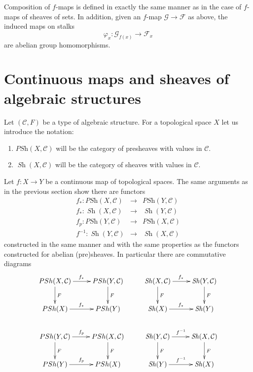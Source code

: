 \documentclass{stacks-project}
\theoremstyle{plain}
\theoremstyle{definition}
\theoremstyle{remark}
\numberwithin{equation}{subsection}
\def\Sh{\mathop{\mathit{Sh}}\nolimits}
\begin{document}
\medskip\noindent
Composition of $f$-maps is defined in exactly the
same manner as in the case of $f$-maps of sheaves of
sets. In addition, given an $f$-map $\mathcal{G} \to \mathcal{F}$
as above, the induced maps on stalks
$$
\varphi_x : \mathcal{G}_{f(x)} \longrightarrow \mathcal{F}_x
$$
are abelian group homomorphisms.


\section{Continuous maps and sheaves of algebraic structures}
\label{section-presheaves-structures-functorial}

\noindent
Let $(\mathcal{C}, F)$ be a type of algebraic structure.
For a topological space $X$ let us introduce the notation:
\begin{enumerate}
\item $\textit{PSh}(X, \mathcal{C})$ will be the category
of presheaves with values in $\mathcal{C}$.
\item $\Sh(X, \mathcal{C})$ will be the category
of sheaves with values in $\mathcal{C}$.
\end{enumerate}
Let $f : X \to Y$ be a continuous map of topological spaces.
The same arguments as in the previous section show
there are functors
\begin{eqnarray*}
f_* : \textit{PSh}(X, \mathcal{C}) &
\longrightarrow &
\textit{PSh}(Y, \mathcal{C}) \\
f_* : \Sh(X, \mathcal{C}) &
\longrightarrow &
\Sh(Y, \mathcal{C}) \\
f_p : \textit{PSh}(Y, \mathcal{C}) &
\longrightarrow &
\textit{PSh}(X, \mathcal{C}) \\
f^{-1} : \Sh(Y, \mathcal{C}) &
\longrightarrow &
\Sh(X, \mathcal{C})
\end{eqnarray*}
constructed in the same manner and with the same
properties as the functors constructed for abelian
(pre)sheaves. In particular there are commutative diagrams
$$
\xymatrix{
\textit{PSh}(X, \mathcal{C}) \ar[r]^{f_*} \ar[d]^F &
\textit{PSh}(Y, \mathcal{C}) \ar[d]^F &
\Sh(X, \mathcal{C}) \ar[r]^{f_*} \ar[d]^F &
\Sh(Y, \mathcal{C}) \ar[d]^F
\\
\textit{PSh}(X) \ar[r]^{f_*} &
\textit{PSh}(Y) &
\Sh(X) \ar[r]^{f_*} &
\Sh(Y)
\\
\textit{PSh}(Y, \mathcal{C}) \ar[r]^{f_p} \ar[d]^F &
\textit{PSh}(X, \mathcal{C}) \ar[d]^F &
\Sh(Y, \mathcal{C}) \ar[r]^{f^{-1}} \ar[d]^F &
\Sh(X, \mathcal{C}) \ar[d]^F
\\
\textit{PSh}(Y) \ar[r]^{f_p} &
\textit{PSh}(X) &
\Sh(Y) \ar[r]^{f^{-1}} &
\Sh(X)
}
$$
\end{document}
